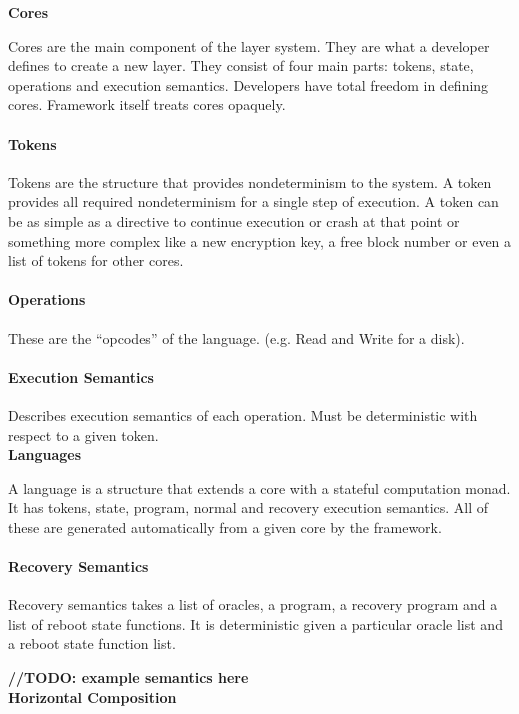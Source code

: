 \documentclass[onecolumn]{paper}
\begin{document}
		{\bf Cores}
		
		Cores are the main component of the layer system. They are what a developer defines to create a new layer. They consist of four main parts: tokens, state, operations and execution semantics. Developers have total freedom in defining cores. Framework itself treats cores opaquely.
		
		\paragraph{Tokens}
		Tokens are the structure that provides nondeterminism to the system. A token provides all required nondeterminism for a single step of execution. A token can be as simple as a directive to continue execution or crash at that point or something more complex like a new encryption key, a free block number or even a list of tokens for other cores.
		
		\paragraph{Operations}
		These are the “opcodes” of the language. (e.g. Read and Write for a disk).
		
		
		\paragraph{Execution Semantics}
		Describes execution semantics of each operation. Must be deterministic with respect to a given token.\\
		
		{\bf Languages}
		
		A language is a structure that extends a core with a stateful computation monad. It has tokens, state, program, normal and recovery execution semantics. All of these are generated automatically from a given core by the framework.
		
		\paragraph{Recovery Semantics}
		Recovery semantics takes a list of oracles, a program, a recovery program and a list of reboot state functions. It is deterministic given a particular oracle list and a reboot state function list.
		
		{\bf //TODO: example semantics here}\\
				
		{\bf Horizontal Composition}
		
\end{document}
